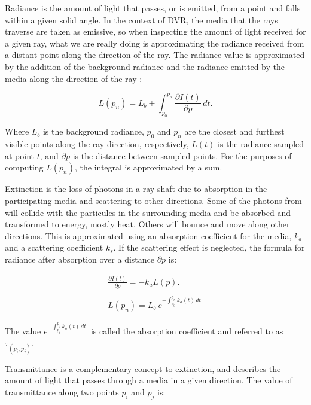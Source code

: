 \documentclass[oneside,a4paper,english,links]{amca}
\begin{document}
Radiance is the amount of light that passes, or is emitted, from a
point and falls within a given solid angle. In the context of DVR, the
media that the rays traverse are taken as emissive, so when inspecting
the amount of light received for a given ray, what we are really doing
is approximating the radiance received from a distant point along the
direction of the ray. The radiance value is approximated by the
addition of the background radiance and the radiance emitted by the
media along the direction of the ray : 

\begin{equation} \label{eq:general_radiance}  
L(p_n) = L_b + \int_{p_0}^{p_n} \frac{\partial I(t)}{\partial p} \, dt.
\end{equation}

Where $L_b$ is the background radiance, $p_0$ and $p_n$ are the
closest and furthest visible points along the ray direction,
respectively, $L(t)$ is the radiance sampled at point $t$, and
$\partial p$ is the distance between sampled points. For the purposes
of computing $L(p_n)$, the integral is approximated by a sum.

Extinction is the loss of photons in a ray shaft due to absorption in
the participating media and scattering to other directions. Some of
the photons from  will collide with the particules in the
surrounding media and be absorbed and transformed to energy, mostly
heat. Others will bounce and move along other directions. This is
approximated using an absorption coefficient for the media, $k_a$ and
a scattering coefficient $k_s$. If the scattering effect is neglected,
the formula for radiance after absorption over a distance $\partial p$
is:

\begin{equation} \label{eq:absorption_radiance}  
\begin{aligned}
\frac{\partial I(t)}{\partial p} = -k_a L(p). 
\\
\\
L(p_n) = L_b \ e^{-\int_{p_0}^{p_n} k_a(t) \, dt.}
\end{aligned}
\end{equation}

The value $e^{-\int_{p_i}^{p_j} k_a(t) \, dt.}$ is called the
absorption coefficient and referred to as $\tau_{(p_i, p_j)}$.

Transmittance is a complementary concept to extinction, and describes
the amount of light that passes through a media in a given
direction. The value of transmittance along two points $p_i$ and $p_j$
is:
\end{document}
